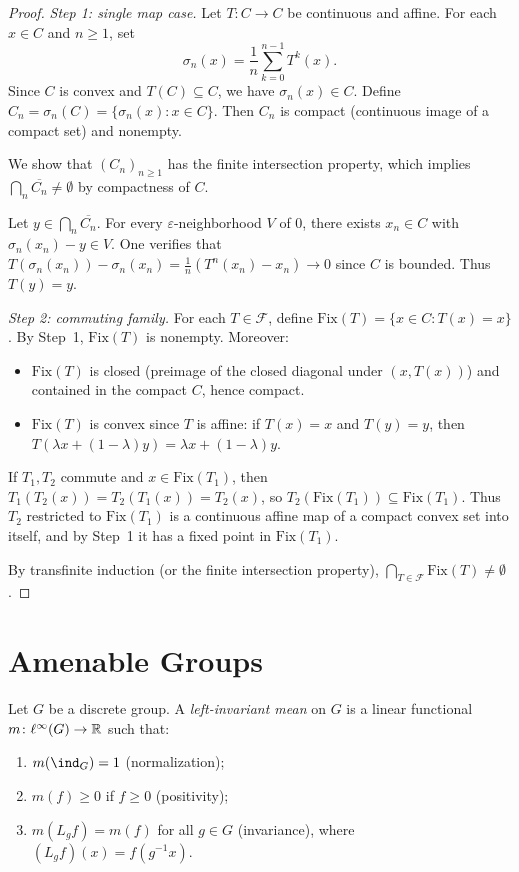\begin{proof}
\emph{Step 1: single map case.}
Let $T\colon C \to C$ be continuous and affine. For each $x \in C$ and $n \geq 1$, set
\[
  \sigma_n(x) = \frac{1}{n} \sum_{k=0}^{n-1} T^k(x).
\]
Since $C$ is convex and $T(C) \subseteq C$, we have $\sigma_n(x) \in C$. Define
$C_n = \sigma_n(C) = \{\sigma_n(x) : x \in C\}$. Then $C_n$ is compact (continuous image
of a compact set) and nonempty.

We show that $(C_n)_{n \geq 1}$ has the finite intersection property, which implies
$\bigcap_n \overline{C_n} \neq \emptyset$ by compactness of $C$.

Let $y \in \bigcap_n \overline{C_n}$. For every $\varepsilon$-neighborhood $V$ of $0$,
there exists $x_n \in C$ with $\sigma_n(x_n) - y \in V$. One verifies that
$T(\sigma_n(x_n)) - \sigma_n(x_n) = \frac{1}{n}(T^n(x_n) - x_n) \to 0$ since $C$ is
bounded. Thus $T(y) = y$.

\emph{Step 2: commuting family.}
For each $T \in \mathcal{F}$, define $\mathrm{Fix}(T) = \{x \in C : T(x) = x\}$. By
Step~1, $\mathrm{Fix}(T)$ is nonempty. Moreover:
\begin{itemize}
  \item $\mathrm{Fix}(T)$ is closed (preimage of the closed diagonal under $(x, T(x))$)
    and contained in the compact $C$, hence compact.
  \item $\mathrm{Fix}(T)$ is convex since $T$ is affine: if $T(x) = x$ and $T(y) = y$,
    then $T(\lambda x + (1-\lambda)y) = \lambda x + (1-\lambda)y$.
\end{itemize}
If $T_1, T_2$ commute and $x \in \mathrm{Fix}(T_1)$, then
$T_1(T_2(x)) = T_2(T_1(x)) = T_2(x)$, so
$T_2(\mathrm{Fix}(T_1)) \subseteq \mathrm{Fix}(T_1)$. Thus $T_2$ restricted to
$\mathrm{Fix}(T_1)$ is a continuous affine map of a compact convex set into itself, and
by Step~1 it has a fixed point in $\mathrm{Fix}(T_1)$.

By transfinite induction (or the finite intersection property),
$\bigcap_{T \in \mathcal{F}} \mathrm{Fix}(T) \neq \emptyset$.
\end{proof}

\section{Amenable Groups}

\begin{definition}
Let $G$ be a discrete group. A \emph{left-invariant mean} on $G$ is a linear functional
$m\colon \ell^\infty(G) \to \mathbb{R}$ such that:
\begin{enumerate}
  \item $m(\ind_G) = 1$ (normalization);
  \item $m(f) \geq 0$ if $f \geq 0$ (positivity);
  \item $m(L_g f) = m(f)$ for all $g \in G$ (invariance), where $(L_g f)(x) = f(g^{-1}x)$.
\end{enumerate}
\end{definition}

